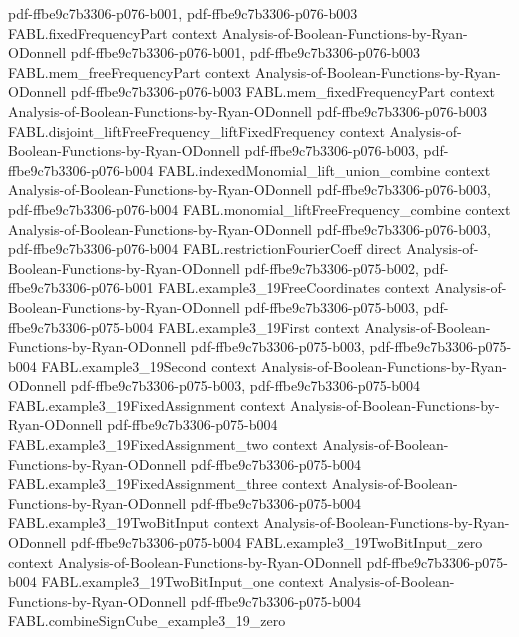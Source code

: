 \begin{theorem}
  {pdf-ffbe9c7b3306-p076-b001,
    pdf-ffbe9c7b3306-p076-b003}
\proofstep
  {FABL.fixedFrequencyPart}
  {context}
  {Analysis-of-Boolean-Functions-by-Ryan-ODonnell}
  {pdf-ffbe9c7b3306-p076-b001,
    pdf-ffbe9c7b3306-p076-b003}
\proofstep
  {FABL.mem_freeFrequencyPart}
  {context}
  {Analysis-of-Boolean-Functions-by-Ryan-ODonnell}
  {pdf-ffbe9c7b3306-p076-b003}
\proofstep
  {FABL.mem_fixedFrequencyPart}
  {context}
  {Analysis-of-Boolean-Functions-by-Ryan-ODonnell}
  {pdf-ffbe9c7b3306-p076-b003}
\proofstep
  {FABL.disjoint_liftFreeFrequency_liftFixedFrequency}
  {context}
  {Analysis-of-Boolean-Functions-by-Ryan-ODonnell}
  {pdf-ffbe9c7b3306-p076-b003,
    pdf-ffbe9c7b3306-p076-b004}
\proofstep
  {FABL.indexedMonomial_lift_union_combine}
  {context}
  {Analysis-of-Boolean-Functions-by-Ryan-ODonnell}
  {pdf-ffbe9c7b3306-p076-b003,
    pdf-ffbe9c7b3306-p076-b004}
\proofstep
  {FABL.monomial_liftFreeFrequency_combine}
  {context}
  {Analysis-of-Boolean-Functions-by-Ryan-ODonnell}
  {pdf-ffbe9c7b3306-p076-b003,
    pdf-ffbe9c7b3306-p076-b004}
\proofstep
  {FABL.restrictionFourierCoeff}
  {direct}
  {Analysis-of-Boolean-Functions-by-Ryan-ODonnell}
  {pdf-ffbe9c7b3306-p075-b002,
    pdf-ffbe9c7b3306-p076-b001}
\proofstep
  {FABL.example3_19FreeCoordinates}
  {context}
  {Analysis-of-Boolean-Functions-by-Ryan-ODonnell}
  {pdf-ffbe9c7b3306-p075-b003,
    pdf-ffbe9c7b3306-p075-b004}
\proofstep
  {FABL.example3_19First}
  {context}
  {Analysis-of-Boolean-Functions-by-Ryan-ODonnell}
  {pdf-ffbe9c7b3306-p075-b003,
    pdf-ffbe9c7b3306-p075-b004}
\proofstep
  {FABL.example3_19Second}
  {context}
  {Analysis-of-Boolean-Functions-by-Ryan-ODonnell}
  {pdf-ffbe9c7b3306-p075-b003,
    pdf-ffbe9c7b3306-p075-b004}
\proofstep
  {FABL.example3_19FixedAssignment}
  {context}
  {Analysis-of-Boolean-Functions-by-Ryan-ODonnell}
  {pdf-ffbe9c7b3306-p075-b004}
\proofstep
  {FABL.example3_19FixedAssignment_two}
  {context}
  {Analysis-of-Boolean-Functions-by-Ryan-ODonnell}
  {pdf-ffbe9c7b3306-p075-b004}
\proofstep
  {FABL.example3_19FixedAssignment_three}
  {context}
  {Analysis-of-Boolean-Functions-by-Ryan-ODonnell}
  {pdf-ffbe9c7b3306-p075-b004}
\proofstep
  {FABL.example3_19TwoBitInput}
  {context}
  {Analysis-of-Boolean-Functions-by-Ryan-ODonnell}
  {pdf-ffbe9c7b3306-p075-b004}
\proofstep
  {FABL.example3_19TwoBitInput_zero}
  {context}
  {Analysis-of-Boolean-Functions-by-Ryan-ODonnell}
  {pdf-ffbe9c7b3306-p075-b004}
\proofstep
  {FABL.example3_19TwoBitInput_one}
  {context}
  {Analysis-of-Boolean-Functions-by-Ryan-ODonnell}
  {pdf-ffbe9c7b3306-p075-b004}
\proofstep
  {FABL.combineSignCube_example3_19_zero}

\end{theorem}

